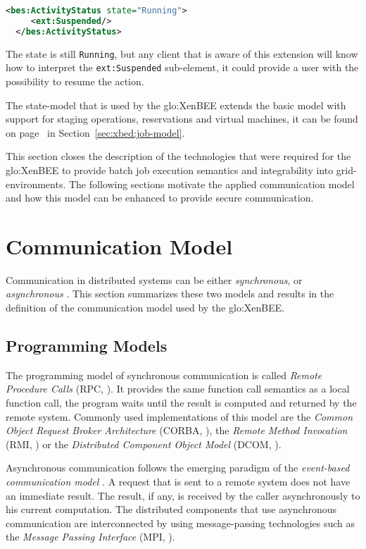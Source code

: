 \begin{lstlisting}[float={h!},language=XML]
  <bes:ActivityStatus state="Running">
     <ext:Suspended/>
  </bes:ActivityStatus>
\end{lstlisting}

The state is still \texttt{Running}, but  any client that is aware of this
extension   will  know   how  to   interpret   the  \texttt{ext:Suspended}
sub-element, \ie it could provide  a user with the possibility to resume
the action.

The state-model  that is  used by the  \gls{glo:XenBEE} extends  the basic
model  with  support  for  staging operations,  reservations  and  virtual
machines,  it   can  be  found   on  page~\pageref{sec:xbed:job-model}  in
Section~\ref{sec:xbed:job-model}.

This section closes the description of the technologies that were required
for  the \gls{glo:XenBEE}  to provide  batch job  execution  semantics and
integrability into grid-environments.  The following sections motivate the
applied communication model and how  this model can be enhanced to provide
secure communication.

\section{Communication Model}
\label{sec:fundamental:communication-model}

Communication in distributed systems  can be either \emph{synchronous}, or
\emph{asynchronous}  \cite{MeCa:2005:Taxonomy}.   This section  summarizes
these two models and results  in the definition of the communication model
used by the \gls{glo:XenBEE}.

\subsection{Programming Models}

The programming model of  synchronous communication is called \emph{Remote
  Procedure Calls}  (RPC, \cite{rpc}). It provides the  same function call
semantics as a local function call, \ie the program waits until the result
is   computed  and  returned   by  the   remote  system.    Commonly  used
implementations of  this model are the \emph{Common  Object Request Broker
  Architecture} (CORBA, \cite{corba}), the \emph{Remote Method Invocation}
(RMI, \cite{rmi}) or the  \emph{Distributed Component Object Model} (DCOM,
\cite{dcom}).

Asynchronous   communication  follows   the  emerging   paradigm   of  the
\emph{event-based   communication  model}   \cite{MeCa:2005:Taxonomy}.   A
request  that is  sent  to a  remote  system does  not  have an  immediate
result. The  result, if any, is  received by the  caller asynchronously to
his current computation. The  distributed components that use asynchronous
communication  are interconnected  by  using message-passing  technologies
such as the \emph{Message Passing Interface} (MPI, \cite{mpi}).

